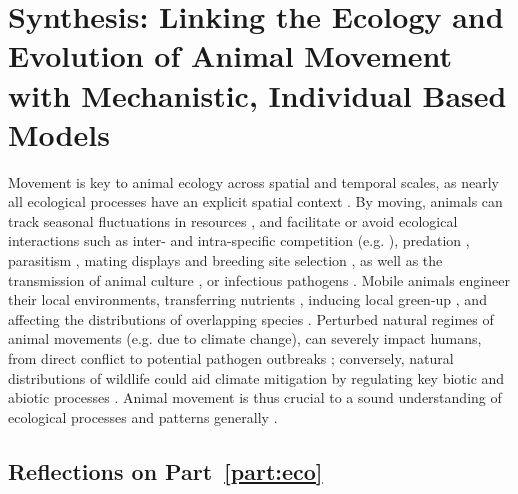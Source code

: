 
%
\chapter{Synthesis: Linking the Ecology and Evolution of Animal Movement with Mechanistic, Individual Based Models}\label{ch:discussion}

Movement is key to animal ecology across spatial and temporal scales, as nearly all ecological processes have an explicit spatial context \citep{nathan2008a}.
By moving, animals can track seasonal fluctuations in resources \citep{geremia2019,abrahms2021a}, and facilitate or avoid ecological interactions such as inter- and intra-specific competition (e.g. \cite{duckworth2007}), predation \citep[e.g.][]{kohl2018}, parasitism \citep{weinstein2018}, mating displays and breeding site selection \citep{kempenaers2017}, as well as the transmission of animal culture \citep{jesmer2018,klump2021}, or infectious pathogens \citep[][see also Chapter~\ref{ch:pathomove}]{weinstein2018,monk2022,stroeymeyt2018}.
Mobile animals engineer their local environments, transferring nutrients \citep{leroux2018}, inducing local green-up \citep{geremia2019}, and affecting the distributions of overlapping species \citep[see e.g.][]{kohl2018,leroux2018,duckworth2007,monk2022}.
Perturbed natural regimes of animal movements (e.g. due to climate change), can severely impact humans, from direct conflict \citep{abrahms2021} to potential pathogen outbreaks \citep{carlson2022a,wille2022}; conversely, natural distributions of wildlife could aid climate mitigation by regulating key biotic and abiotic processes \citep{schmitz2018,malhi2022}.
Animal movement is thus crucial to a sound understanding of ecological processes and patterns generally \citep{jeltsch2013,schlagel2020}.

\section*{Reflections on Part~\ref{part:eco}}

